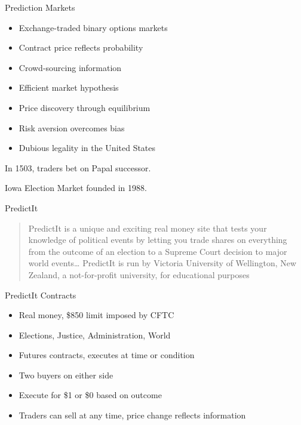 \documentclass[ignorenonframetext,]{beamer}
\providecommand{\tightlist}{%
  \setlength{\itemsep}{0pt}\setlength{\parskip}{0pt}}
\begin{document}
\begin{frame}{Prediction Markets}
\protect\hypertarget{prediction-markets}{}

\begin{itemize}
\tightlist
\item
  Exchange-traded binary options markets
\item
  Contract price reflects probability
\item
  Crowd-sourcing information
\item
  Efficient market hypothesis
\item
  Price discovery through equilibrium
\item
  Risk aversion overcomes bias
\item
  Dubious legality in the United States
\end{itemize}

In 1503, traders bet on Papal successor.

Iowa Election Market founded in 1988.

\end{frame}

\begin{frame}{PredictIt}
\protect\hypertarget{predictit}{}

\begin{quote}
PredictIt is a unique and exciting real money site that tests your
knowledge of political events by letting you trade shares on everything
from the outcome of an election to a Supreme Court decision to major
world events\ldots{} PredictIt is run by Victoria University of
Wellington, New Zealand, a not-for-profit university, for educational
purposes
\end{quote}

\end{frame}

\begin{frame}{PredictIt Contracts}
\protect\hypertarget{predictit-contracts}{}

\begin{itemize}
\tightlist
\item
  Real money, \$850 limit imposed by CFTC
\item
  Elections, Justice, Administration, World
\item
  Futures contracts, executes at time or condition
\item
  Two buyers on either side
\item
  Execute for \$1 or \$0 based on outcome
\item
  Traders can sell at any time, price change reflects information
\end{itemize}

\end{frame}
\end{document}
